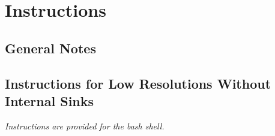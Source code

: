 \documentclass{article}
\begin{document}
\section{Instructions} \label{sec-instr}
\subsection{General Notes}
\subsection{Instructions for Low Resolutions Without Internal Sinks}

\emph{Instructions are provided for the bash shell.}

%
%
\end{document}
